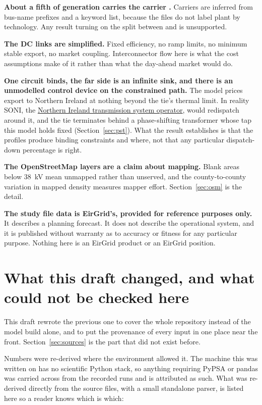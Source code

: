 \documentclass[11pt,a4paper]{article}
\begin{document}
\textbf{About a fifth of generation carries the carrier .}
Carriers are inferred from bus-name prefixes and a keyword list, because the
files do not label plant by technology. Any result turning on the split between
 and  is unsupported.

\textbf{The DC links are simplified.} Fixed efficiency, no ramp limits, no
minimum stable export, no market coupling. Interconnector flow here is what the
cost assumptions make of it rather than what the day-ahead market would do.

\textbf{One circuit binds, the far side is an infinite sink, and there is an
unmodelled control device on the constrained path.} The model prices export to
Northern Ireland at nothing beyond the tie's thermal limit. In reality SONI,
the \href{https://www.soni.ltd.uk/about-us/what-we-do}{Northern Ireland transmission system operator}, would redispatch
around it, and the tie terminates behind a phase-shifting transformer whose tap
this model holds fixed (Section~\ref{sec:pst}). What the result establishes is
that the profiles produce binding constraints and where, not that any
particular dispatch-down percentage is right.

\textbf{The OpenStreetMap layers are a claim about mapping.} Blank areas below
38~kV mean unmapped rather than unserved, and the county-to-county variation in
mapped density measures mapper effort. Section~\ref{sec:osm} is the detail.

\textbf{The study file data is EirGrid's, provided for reference purposes
only.} It describes a planning forecast. It does not describe the operational
system, and it is published without warranty as to accuracy or fitness for any
particular purpose. Nothing here is an EirGrid product or an EirGrid position.

\section{What this draft changed, and what could not be checked here}
\label{sec:corrections}

This draft rewrote the previous one to cover the whole repository instead of
the model build alone, and to put the provenance of every input in one place
near the front. Section~\ref{sec:sources} is the part that did not exist
before.

Numbers were re-derived where the environment allowed it. The machine this was
written on has no scientific Python stack, so anything requiring PyPSA or
pandas was carried across from the recorded runs and is attributed as such.
What was re-derived directly from the source files, with a small standalone
parser, is listed here so a reader knows which is which:
\end{document}
